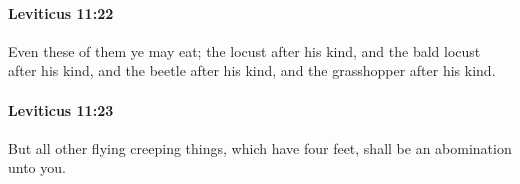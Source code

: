 		\paragraph{Leviticus 11:22} %
			\label{LEVITICUS-11-22}

			Even these of them ye may eat; the locust after his kind, and the bald locust after his kind, and the beetle after his kind, and the grasshopper after his kind.


		\paragraph{Leviticus 11:23} %
			\label{LEVITICUS-11-23}

			But all other flying creeping things, which have four feet, shall be an abomination unto you.


